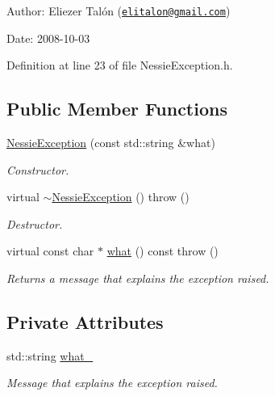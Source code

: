 \begin{Desc}
\item[Author:]Eliezer Talón (\href{mailto:elitalon@gmail.com}{\tt elitalon@gmail.com}) \end{Desc}
\begin{Desc}
\item[Date:]2008-10-03 \end{Desc}


Definition at line 23 of file NessieException.h.\subsection*{Public Member Functions}
\begin{CompactItemize}
\item 
\hyperlink{class_nessie_exception_80c86c892438045635bf6a99da17e859}{NessieException} (const std::string \&what)
\begin{CompactList}\small\item\em Constructor. \item\end{CompactList}\item 
virtual \hyperlink{class_nessie_exception_19f44d2725dd53e2f10505a88e5773f2}{$\sim$NessieException} ()  throw ()
\begin{CompactList}\small\item\em Destructor. \item\end{CompactList}\item 
virtual const char $\ast$ \hyperlink{class_nessie_exception_a522c2ea164e88be0b26670170b33909}{what} () const   throw ()
\begin{CompactList}\small\item\em Returns a message that explains the exception raised. \item\end{CompactList}\end{CompactItemize}
\subsection*{Private Attributes}
\begin{CompactItemize}
\item 
\hypertarget{class_nessie_exception_3464c36d30d9baabd0b10ac4797d4b5b}{
std::string \hyperlink{class_nessie_exception_3464c36d30d9baabd0b10ac4797d4b5b}{what\_\-}}
\label{class_nessie_exception_3464c36d30d9baabd0b10ac4797d4b5b}

\begin{CompactList}\small\item\em Message that explains the exception raised. \item\end{CompactList}\end{CompactItemize}



